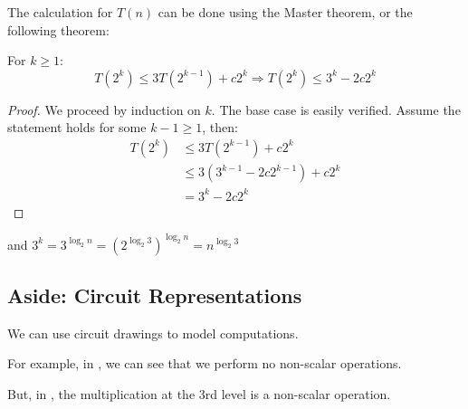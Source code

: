 The calculation for $T(n)$ can be done using the Master theorem, or the following theorem:
\begin{theorem}{}{}
    For $k \geq 1$:
    \[T(2^k) \leq 3T(2^{k-1}) + c2^k \Rightarrow T(2^k) \leq 3^k - 2c2^k\]
\end{theorem}
\begin{proof}
    We proceed by induction on $k$. The base case is easily verified. Assume the statement holds for some $k-1 \geq 1$, then:
    \begin{align*}
        T(2^k) &\leq 3T(2^{k-1}) + c2^k \\
        &\leq 3(3^{k-1} - 2c2^{k-1}) + c2^k \\
        &= 3^k - 2c2^k
    \end{align*}
\end{proof}
and $3^k = 3^{\log_2 n} = (2^{\log_2 3})^{\log_2 n} = n^{\log_2 3}$

\subsection{Aside: Circuit Representations}
We can use circuit drawings to model computations.

For example, in , we can see that we perform no non-scalar operations.

But, in , the multiplication at the 3rd level is a non-scalar operation.

